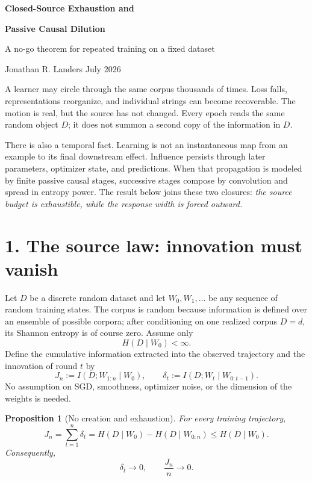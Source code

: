 \documentclass[10pt]{article}
\theoremstyle{compact}
\newtheorem{proposition}{Proposition}
\begin{document}
\begin{center}
{\LARGE\bfseries Closed-Source Exhaustion and}\par
\vspace{-0.08em}
{\LARGE\bfseries Passive Causal Dilution}\par
\vspace{0.18em}
{\large A no-go theorem for repeated training on a fixed dataset}\par
\vspace{0.52em}
{Jonathan R. Landers \qquad July 2026}
\end{center}
\vspace{0.2em}

A learner may circle through the same corpus thousands of times. Loss falls, representations reorganize, and individual strings can become recoverable. The motion is real, but the source has not changed. Every epoch reads the same random object $D$; it does not summon a second copy of the information in $D$.

There is also a temporal fact. Learning is not an instantaneous map from an example to its final downstream effect. Influence persists through later parameters, optimizer state, and predictions. When that propagation is modeled by finite passive causal stages, successive stages compose by convolution and spread in entropy power. The result below joins these two closures: \emph{the source budget is exhaustible, while the response width is forced outward.}

\section*{1. The source law: innovation must vanish}
Let $D$ be a discrete random dataset and let $W_0,W_1,\ldots$ be any sequence of random training states. The corpus is random because information is defined over an ensemble of possible corpora; after conditioning on one realized corpus $D=d$, its Shannon entropy is of course zero. Assume only
\[
H(D\mid W_0)<\infty.
\]
Define the cumulative information extracted into the observed trajectory and the innovation of round $t$ by
\[
J_n:=I(D;W_{1:n}\mid W_0),
\qquad
\delta_t:=I(D;W_t\mid W_{0:t-1}).
\tag{1}
\]
No assumption on SGD, smoothness, optimizer noise, or the dimension of the weights is needed.

\begin{proposition}[No creation and exhaustion]
For every training trajectory,
\[
J_n=\sum_{t=1}^{n}\delta_t
=H(D\mid W_0)-H(D\mid W_{0:n})
\le H(D\mid W_0).
\tag{2}
\]
Consequently,
\[
\boxed{\delta_t\longrightarrow0},
\qquad
\boxed{\frac{J_n}{n}\longrightarrow0}.
\tag{3}
\]
\end{proposition}
\end{document}
